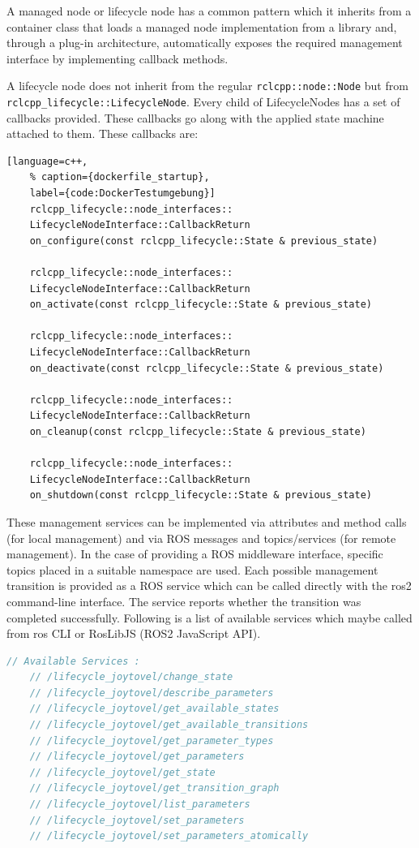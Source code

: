 	A managed node or lifecycle node has a common pattern which it inherits from a container class that loads a managed node implementation from a library and, through a plug-in architecture, automatically exposes the required management interface by implementing callback methods. 

	A lifecycle node does not inherit from the regular \lstinline{rclcpp::node::Node} but from\\  \lstinline{rclcpp_lifecycle::LifecycleNode}. Every child of LifecycleNodes has a set of callbacks provided. These callbacks go along with the applied state machine attached to them. These callbacks are:

\begin{lstlisting}[language=c++,
	% caption={dockerfile_startup}, 
	label={code:DockerTestumgebung}]
	rclcpp_lifecycle::node_interfaces::
	LifecycleNodeInterface::CallbackReturn
	on_configure(const rclcpp_lifecycle::State & previous_state)

	rclcpp_lifecycle::node_interfaces::
	LifecycleNodeInterface::CallbackReturn
	on_activate(const rclcpp_lifecycle::State & previous_state)

	rclcpp_lifecycle::node_interfaces::
	LifecycleNodeInterface::CallbackReturn
	on_deactivate(const rclcpp_lifecycle::State & previous_state)

	rclcpp_lifecycle::node_interfaces::
	LifecycleNodeInterface::CallbackReturn
	on_cleanup(const rclcpp_lifecycle::State & previous_state)

	rclcpp_lifecycle::node_interfaces::
	LifecycleNodeInterface::CallbackReturn
	on_shutdown(const rclcpp_lifecycle::State & previous_state)

\end{lstlisting}

These management services can be implemented via attributes and method calls (for local management) and via ROS messages and topics/services (for remote management). In the case of providing a ROS middleware interface, specific topics placed in a suitable namespace are used. Each possible management transition is provided as a ROS service which can be called directly with the ros2 command-line interface. The service reports whether the transition was completed successfully. Following is a list of available services which maybe called from ros CLI or RosLibJS (ROS2 JavaScript API). 

\begin{lstlisting}[language=JavaScript]
	// Available Services :
	// /lifecycle_joytovel/change_state
	// /lifecycle_joytovel/describe_parameters
	// /lifecycle_joytovel/get_available_states
	// /lifecycle_joytovel/get_available_transitions
	// /lifecycle_joytovel/get_parameter_types
	// /lifecycle_joytovel/get_parameters
	// /lifecycle_joytovel/get_state
	// /lifecycle_joytovel/get_transition_graph
	// /lifecycle_joytovel/list_parameters
	// /lifecycle_joytovel/set_parameters
	// /lifecycle_joytovel/set_parameters_atomically
\end{lstlisting}

